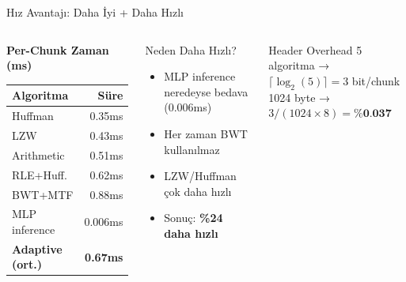 \documentclass[10pt,aspectratio=43]{beamer}
\begin{document}
\begin{frame}{Hız Avantajı: Daha İyi + Daha Hızlı}
  \begin{columns}[T]
    \begin{center}
      \textbf{Per-Chunk Zaman (ms)}
      \vspace{0.3em}

      \begin{tabular}{lr}
        \toprule
        \textbf{Algoritma} & \textbf{Süre} \\
        \midrule
        Huffman & 0.35ms \\
        LZW & 0.43ms \\
        Arithmetic & 0.51ms \\
        RLE+Huff. & 0.62ms \\
        BWT+MTF & 0.88ms \\
        \midrule
        MLP inference & 0.006ms \\
        \midrule
        \rowcolor{teal!15} \textbf{Adaptive (ort.)} & \textbf{0.67ms} \\
        \bottomrule
      \end{tabular}
    \end{center}

    \begin{alertblock}{Neden Daha Hızlı?}
      \begin{itemize}
        \setlength{\itemsep}{0.5em}
        \item MLP inference neredeyse bedava (0.006ms)
        \item Her zaman BWT kullanılmaz
        \item LZW/Huffman çok daha hızlı
        \item Sonuç: \textbf{\%24 daha hızlı}
      \end{itemize}
    \end{alertblock}

    \vspace{0.5em}
    \begin{block}{Header Overhead}
      5 algoritma → $\lceil\log_2(5)\rceil = 3$ bit/chunk \\
      1024 byte → $3/(1024\times8) = \textbf{\%0.037}$
    \end{block}
  \end{columns}
\end{frame}
\end{document}
